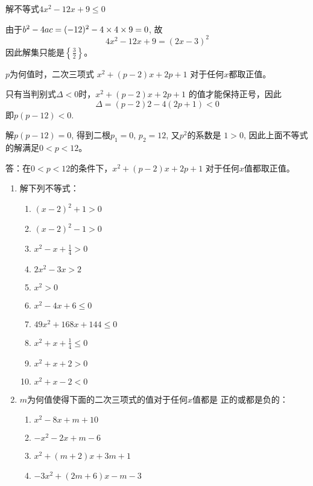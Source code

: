 \begin{example}
解不等式$4x^2-12x+9\le 0$
\end{example}

\begin{solution}
    由于$b^2-4ac=(-12)^2-4\times4\times9=0$, 故
\[4x^2-12x+9=(2x-3)^2\]
因此解集只能是$\left\{\frac{3}{2}\right\}$。
\end{solution}


\begin{example}
    $p$为何值时，二次三项式
$x^2+(p-2)x+2p+1$
对于任何$x$都取正值。
\end{example}


\begin{solution}
    只有当判别式$\Delta<0$时，$x^2+(p-2)x+2p+1$
的值才能保持正号，因此
$$\Delta=(p-2)2-4(2p+1)<0$$
即$p(p-12)<0$.

解$p(p-12)=0$, 得到二根$p_1=0$, $p_2=12$, 又$p^2$的系数是
$1>0$, 因此上面不等式的解满足$0<p<12$。

答：在$0<p<12$的条件下，$x^2+(p-2)x+2p+1$
对于任何$x$值都取正值。
\end{solution}


\begin{ex}
\begin{enumerate}
    \item 解下列不等式：
\begin{multicols}{2}
\begin{enumerate}
    \item $(x-2)^2+1>0$
    \item $(x-2)^2-1>0$
    \item $x^2-x+\frac{1}{4}>0$
    \item $2x^2-3x>2$
    \item $x^2>0$
    \item $x^2-4x+6\le 0$
    \item $49x^2+168x+144\le 0$
    \item $x^2+x+\frac{1}{4}\le 0$
    \item $x^2+x+2>0$
    \item $x^2+x-2<0$
\end{enumerate}
\end{multicols}
    \item $m$为何值使得下面的二次三项式的值对于任何$x$值都是
    正的或都是负的：
\begin{multicols}{2}
\begin{enumerate}
    \item $x^2-8x+m+10$
    \item $-x^2-2x+m-6$
    \item $x^2+(m+2)x+3m+1$
    \item $-3x^2+(2m+6)x-m-3$
\end{enumerate}
\end{multicols}
\end{enumerate}    
\end{ex}

